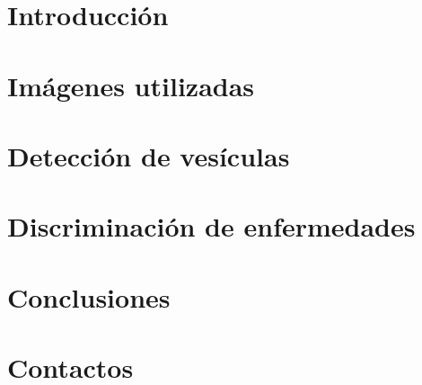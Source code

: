 \documentclass[11pt,a4paper,twoside]{tesis}
\begin{document}
\def\autor{Virginia Arroyo y Juli\'an Oyola}
\def\titulo{An\'alisis y extracci\'on de caracter\'isticas de enfermedades de la piel: su aplicaci\'on en la detecci\'on de varicela}
\def\runtitulo{An\'alisis y extracci\'on de caracter\'isticas de enfermedades de la piel: su aplicaci\'on en la detecci\'on de varicela}
\def\runtitle{Analysis and extraction of features of skin diseases: its application in the detection of varicella}
\def\director{Dra. Ana Ruedin}
\def\codirector{Dr. Daniel Acevedo}
\def\lugar{Buenos Aires, 2012}


\frontmatter
\pagestyle{empty}


\cleardoublepage


\cleardoublepage

\cleardoublepage

\cleardoublepage
\tableofcontents

\mainmatter
\pagestyle{headings}


\chapter{Introducci\'on}


\chapter{Im\'agenes utilizadas}


\chapter{Detecci\'on de ves\'iculas}


\chapter{Discriminaci\'on de enfermedades}

%

\chapter{Conclusiones}


%


\chapter{Contactos}

\end{document}
